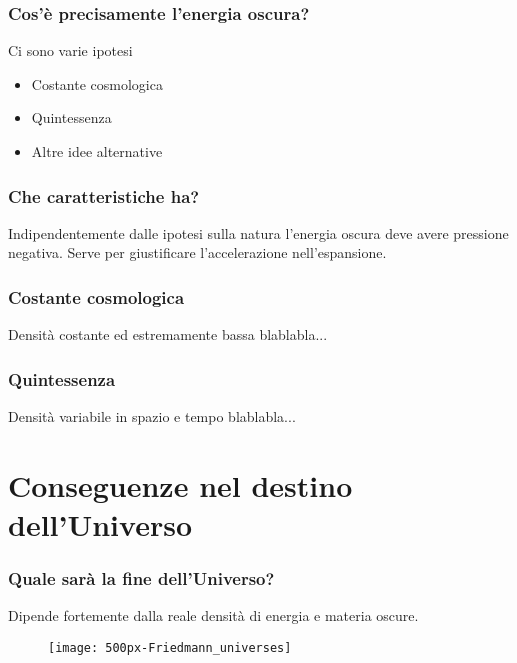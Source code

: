 \begin{frame}
  \frametitle{Cos'è precisamente l'energia oscura?}
  Ci sono varie ipotesi
  \begin{itemize}
  \item Costante cosmologica
  \item Quintessenza
  \item Altre idee alternative
  \end{itemize}
\end{frame}

\begin{frame}
  \frametitle{Che caratteristiche ha?}
  Indipendentemente dalle ipotesi sulla natura l'energia oscura deve avere
  \alert{pressione negativa}. Serve per giustificare l'accelerazione
  nell'espansione.
\end{frame}

\begin{frame}
  \frametitle{Costante cosmologica}
  Densità costante ed estremamente bassa blablabla...
\end{frame}

\begin{frame}
  \frametitle{Quintessenza}
  Densità variabile in spazio e tempo blablabla...
\end{frame}

\section[Conseguenze]{Conseguenze nel destino dell'Universo}

\begin{frame}
  \frametitle{Quale sarà la fine dell'Universo?}
  Dipende fortemente dalla reale densità di energia e materia oscure.
  \begin{figure}
    \centering
    \texttt{[image: 500px-Friedmann\_universes]}
  \end{figure}
\end{frame}

